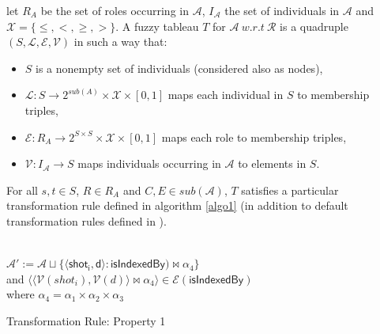 		\begin{definition}
			let $R_{A}$ be the set of roles occurring in $\mathcal{A}$, $I_{\mathcal{A}}$ the set 
			of individuals in $\mathcal{A}$ and $\mathcal{X} = \{\leq, <, \geq, >\}$. A fuzzy tableau 
			$T$ for $\mathcal{A} ~ w.r.t ~ \mathcal{R}$ is a quadruple
			$(S, \mathcal{L, E, V})$ in such a way that:
			\begin{itemize}
				\item $S$ is a nonempty set of individuals (considered also as nodes),
				\item $\mathcal{L} : S \longrightarrow 2^{sub(A)} \times \mathcal{X} \times [0,1]$ 
					maps each individual in $S$ to membership triples,
				\item $\mathcal{E} : R_{A} \longrightarrow 2^{S \times S} \times \mathcal{X} \times [0,1]$ 
					maps each role to membership triples,
				\item $\mathcal{V} : I_{\mathcal{A}} \longrightarrow S$ maps individuals occurring in 
					$\mathcal{A}$ to elements in $S$.
			\end{itemize}
		For all	$s,t \in S$, $R\in R_ {A}$ and $C,E \in sub(\mathcal{A})$, $T$ satisfies a particular 
		transformation rule defined in algorithm \ref{algo1}	
		(in addition to default transformation rules defined in \citep{Stoilos2005}).	

		\begin{algorithm}
					{
						{\\$\mathcal{A'} := \mathcal{A} \sqcup \{ \langle{}\mathsf{shot_{i}},
							\mathsf{d}\rangle:
							\mathsf{isIndexedBy}) \bowtie \alpha_{4}\}$\\
							and $\langle \langle\mathcal{V}(shot_{i}),\mathcal{V}(d)\rangle
							\bowtie \alpha_{4}\rangle 
							\in \mathcal{E}(\mathsf{isIndexedBy})$ \\
							where $\alpha_{4} = \alpha_{1} \times \alpha_{2} \times \alpha_{3}$}
						}
					\caption{Transformation Rule: Property 1}
					\label{algo1}
				\end{algorithm}
				
		\end{definition}
